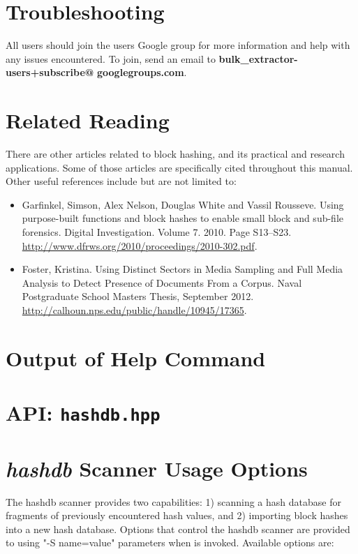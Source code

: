 \documentclass[11pt,fleqn]{article} %
\begin{document}



\section{Troubleshooting}
\label{DebuggingHashdb}
All \hash users should join the \bulk users Google group for more information and help with any issues encountered. To join, send an email to \textbf{bulk\_extractor-users+subscribe@} \textbf{googlegroups.com}.  \\
\section{Related Reading}
There are other articles related to block hashing, and its practical and research applications. Some of those articles are specifically cited throughout this manual. Other useful references include but are not limited to:
\begin{itemize}
\item Garfinkel, Simson, Alex Nelson, Douglas White and Vassil Rousseve. Using purpose-built functions and block hashes to enable small block and sub-file forensics. Digital Investigation. Volume 7. 2010. Page S13--S23. \url{http://www.dfrws.org/2010/proceedings/2010-302.pdf}.
\item Foster, Kristina. Using Distinct Sectors in Media Sampling and Full Media Analysis to Detect Presence of Documents From a Corpus. Naval Postgraduate School Masters Thesis, September 2012. \url{http://calhoun.nps.edu/public/handle/10945/17365}.
\end{itemize}

 


\newpage
\appendix
\appendixpage

\section{Output of \hash Help Command}
\label{HelpOutput}
\begingroup
\footnotesize
{
\selectfont

}
\endgroup


\section{\hash API: \texttt{hashdb.hpp}}
\label{hashdbapi}
\lstset{language=C++}
\lstset{basicstyle=\footnotesize}
\lstset{breaklines=true}
\lstset{breakatwhitespace=true}



\section{\bulk \textit{hashdb} Scanner Usage Options}
\label{scannerOptionsAppendix}
The \bulk hashdb scanner provides two capabilities: 1) scanning
a hash database for fragments of previously encountered hash values,
and 2) importing block hashes into a new hash database.
Options that control the hashdb
scanner are provided to \bulk using "-S name=value" parameters
when \bulk is invoked.  Available options are: 

\begingroup
\footnotesize
{
\selectfont

}
\endgroup
\end{document}
